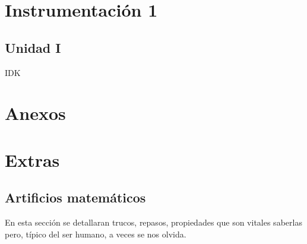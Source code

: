 \documentclass[11pt,fleqn]{book} %
\begin{document}
\part{Instrumentación 1}

\chapter{Unidad I}
IDK

\part{Anexos}











\part{Extras}
\chapter{Artificios matemáticos}
En esta sección se detallaran trucos, repasos, propiedades que son vitales saberlas pero, típico del ser humano, a veces se nos olvida.
\end{document}

